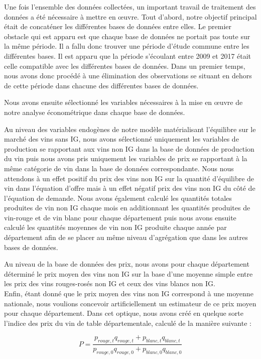 \documentclass[11pt,]{article}
\begin{document}
Une fois l'ensemble des données collectées, un important travail de
traitement des données a été nécessaire à mettre en œuvre. Tout d'abord,
notre objectif principal était de concaténer les différentes bases de
données entre elles. Le premier obstacle qui est apparu est que chaque
base de données ne portait pas toute sur la même période. Il a fallu
donc trouver une période d'étude commune entre les différentes bases. Il
est apparu que la période s'écoulant entre 2009 et 2017 était celle
compatible avec les différentes bases de données. Dans un premier temps,
nous avons donc procédé à une élimination des observations se situant en
dehors de cette période dans chacune des différentes bases de données.

Nous avons ensuite sélectionné les variables nécessaires à la mise en
œuvre de notre analyse économétrique dans chaque base de données.

Au niveau des variables endogènes de notre modèle matérialisant
l'équilibre sur le marché des vins sans IG, nous avons sélectionné
uniquement les variables de production se rapportant aux vins non IG
dans la base de données de production du vin puis nous avons pris
uniquement les variables de prix se rapportant à la même catégorie de
vin dans la base de données correspondante. Nous nous attendons à un
effet positif du prix des vins non IG sur la quantité d'équilibre de vin
dans l'équation d'offre mais à un effet négatif prix des vins non IG du
côté de l'équation de demande. Nous avons également calculé les
quantités totales produites de vin non IG chaque mois en additionnant
les quantités produites de vin-rouge et de vin blanc pour chaque
département puis nous avons ensuite calculé les quantités moyennes de
vin non IG produite chaque année par département afin de se placer au
même niveau d'agrégation que dans les autres bases de données.

Au niveau de la base de données des prix, nous avons pour chaque
département déterminé le prix moyen des vins non IG sur la base d'une
moyenne simple entre les prix des vins rouges-rosés non IG et ceux des
vins blancs non IG.\\
Enfin, étant donné que le prix moyen des vins non IG correspond à une
moyenne nationale, nous voulions concevoir artificiellement un
estimateur de ce prix moyen pour chaque département. Dans cet optique,
nous avons créé en quelque sorte l'indice des prix du vin de table
départementale, calculé de la manière suivante :

\begin{equation*}
  P = \frac{p_{rouge, t} q_{rouge, t} + p_{blanc, t} q_{blanc, t}}{p_{rouge, 0} q_{rouge, 0} + p_{blanc, 0} q_{blanc, 0}}
\end{equation*}
\end{document}
